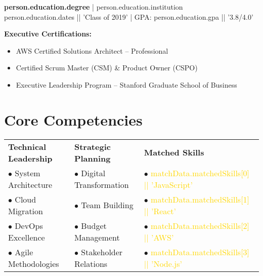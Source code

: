 \documentclass[11pt,a4paper]{article}
\begin{document}
\noindent
\textbf{{{person.education.degree}}} | {{person.education.institution}}\\
{{person.education.dates || 'Class of 2019'}} | GPA: {{person.education.gpa || '3.8/4.0'}}

\noindent
\textbf{Executive Certifications:}
\begin{itemize}[leftmargin=*, topsep=0pt, itemsep=2pt]
    \item AWS Certified Solutions Architect -- Professional
    \item Certified Scrum Master (CSM) \& Product Owner (CSPO)
    \item Executive Leadership Program -- Stanford Graduate School of Business
\end{itemize}

\section{Core Competencies}

\noindent
\begin{tabular}{@{}p{}p{}p{}@{}}
\textbf{Technical Leadership} & \textbf{Strategic Planning} & \textbf{Matched Skills} \\
$\bullet$ System Architecture & $\bullet$ Digital Transformation & $\bullet$ \textcolor{gold}{{{matchData.matchedSkills[0] || 'JavaScript'}}} \\
$\bullet$ Cloud Migration & $\bullet$ Team Building & $\bullet$ \textcolor{gold}{{{matchData.matchedSkills[1] || 'React'}}} \\
$\bullet$ DevOps Excellence & $\bullet$ Budget Management & $\bullet$ \textcolor{gold}{{{matchData.matchedSkills[2] || 'AWS'}}} \\
$\bullet$ Agile Methodologies & $\bullet$ Stakeholder Relations & $\bullet$ \textcolor{gold}{{{matchData.matchedSkills[3] || 'Node.js'}}}
\end{tabular}
\end{document}

